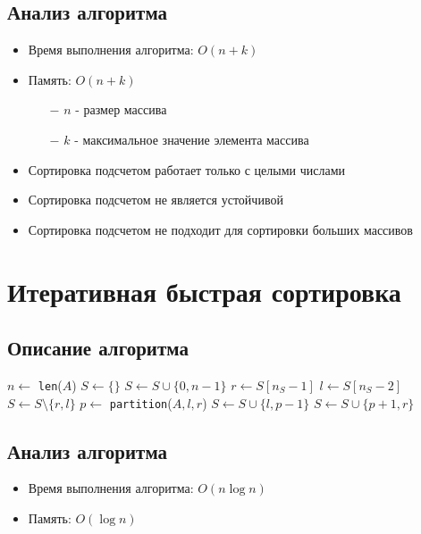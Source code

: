 \subsection{Анализ алгоритма}

\begin{itemize}
    \item Время выполнения алгоритма: $O(n + k)$
    \item Память: $O(n + k)$
    \begin{itemize}
        \item[$-$] $n$ - размер массива
        \item[$-$] $k$ - максимальное значение элемента массива
    \end{itemize}
    \item Сортировка подсчетом работает только с целыми числами
    \item Сортировка подсчетом не является устойчивой
    \item Сортировка подсчетом не подходит для сортировки больших массивов
\end{itemize}

\section{Итеративная быстрая сортировка}

\subsection{Описание алгоритма}

\begin{algorithmic}
\State $n \gets$ \texttt{len}($A$)
\State $S \gets \{\}$ 
\State $S \gets S \cup \{0, n - 1\}$
\State $r \gets S[n_S - 1]$
\State $l \gets S[n_S - 2]$
\State $S \gets S \setminus \{r, l\}$
\State $p \gets$ \texttt{partition}($A, l, r$)
\State $S \gets S \cup \{l, p - 1\}$
\State $S \gets S \cup \{p + 1, r\}$
\EndWhile
\EndProcedure
\end{algorithmic}

\subsection{Анализ алгоритма}

\begin{itemize}
    \item Время выполнения алгоритма: $O(n \log n)$
    \item Память: $O(\log n)$
\end{itemize}
